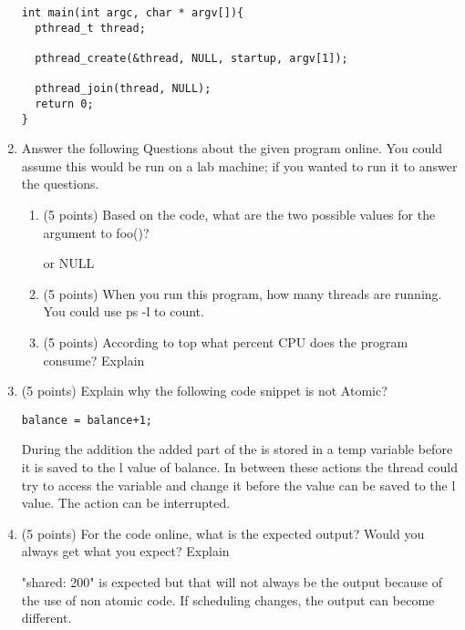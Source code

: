 \documentclass{article}[9pt]
\newenvironment{answerfont}{\fontfamily{qhv}\selectfont}{\par}
\newenvironment{myanswer}{\begin{mdframed}\begin{answerfont}}{\end{answerfont}\end{mdframed}}
\begin{document}
\begin{enumerate}
\begin{myanswer}
\begin{verbatim}
int main(int argc, char * argv[]){
  pthread_t thread;

  pthread_create(&thread, NULL, startup, argv[1]);

  pthread_join(thread, NULL);
  return 0;
}
\end{verbatim}
\end{myanswer}

\item Answer the following Questions about the given program online. You could assume this would be run on a lab machine; if you wanted to run it to answer the questions.
\begin{enumerate}
  \item (5 points) Based on the code, what are the two possible values for the argument to foo()?
  \begin{myanswer}
  1 or NULL
  \end{myanswer}

  \item (5 points) When you run this program, how many threads are running. You could use ps -l to count.
  \begin{myanswer}
  9
  \end{myanswer}

  \item (5 points) According to top what percent CPU does the program consume? Explain
  \begin{myanswer}
  900%
  \end{myanswer}

\end{enumerate}

\item (5 points) Explain why the following code snippet is not Atomic?
\begin{enumerate}
\begin{verbatim}
balance = balance+1;
\end{verbatim}
\end{enumerate}

\begin{myanswer}
During the addition the added part of the is stored in a temp variable before it is saved to the l value of balance. In between these actions the thread could try to access the variable and change it before the value can be saved to the l value.
The action can be interrupted.
\end{myanswer}

\item (5 points) For the code online, what is the expected output? Would you always get what you expect? Explain
\begin{myanswer}
"shared: 200" is expected but that will not always be the output because of the use of non atomic code. If scheduling changes, the output can become different.
\end{myanswer}


\end{enumerate}
\end{document}

